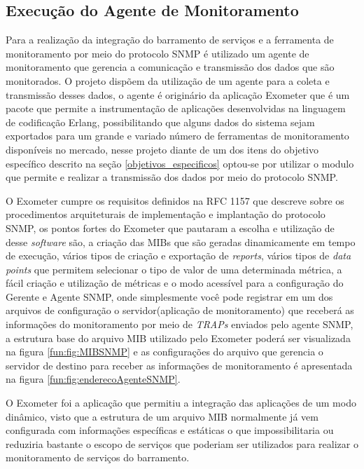 \subsection{Execução do Agente de Monitoramento}

Para a realização da integração do barramento de serviços e a ferramenta de monitoramento por meio do protocolo \acrshort{SNMP} é utilizado um agente de monitoramento que gerencia a comunicação e transmissão dos dados que são monitorados. O projeto dispõem  da utilização de um agente para a coleta e transmissão desses dados, o agente é originário da aplicação Exometer que é um pacote que permite a instrumentação de aplicações desenvolvidas na linguagem de codificação Erlang, possibilitando que alguns dados do sistema sejam exportados para um grande e variado número de ferramentas de monitoramento disponíveis no mercado\cite{exometer_core}, nesse projeto diante de um dos itens do objetivo específico descrito na seção \ref{objetivos_especificos} optou-se por utilizar o modulo que permite e realizar a transmissão dos dados por meio do protocolo \acrshort{SNMP}. 

O Exometer cumpre os requisitos definidos na \acrshort{RFC} 1157 que descreve sobre os procedimentos arquiteturais de implementação e implantação do protocolo \acrshort{SNMP}, os pontos fortes do Exometer que pautaram a escolha e utilização de desse \textit{software} são, a criação das \acrshort{MIBs} que são geradas dinamicamente em tempo de execução, vários tipos de criação e exportação de \textit{reports}, vários tipos de \textit{data points} que permitem selecionar o tipo de valor de uma determinada métrica, a fácil criação e utilização de métricas e o modo  acessível
para a configuração do Gerente e Agente \acrshort{SNMP}, onde simplesmente você pode registrar em um dos arquivos de configuração o servidor(aplicação de monitoramento) que receberá as informações do monitoramento por meio de \textit{TRAPs} enviados pelo agente \acrshort{SNMP}, a estrutura base do arquivo MIB utilizado pelo Exometer poderá ser visualizada na figura \ref{fun:fig:MIBSNMP} e as configurações do arquivo que gerencia o servidor de destino para receber as informações de monitoramento é apresentada na figura \ref{fun:fig:enderecoAgenteSNMP}. 

O Exometer foi a aplicação que permitiu a integração das aplicações de um modo dinâmico, visto que a estrutura de um arquivo MIB normalmente já vem configurada com informações específicas e estáticas o que impossibilitaria ou reduziria bastante o escopo de serviços que poderiam ser utilizados para realizar o monitoramento de serviços do barramento. 

